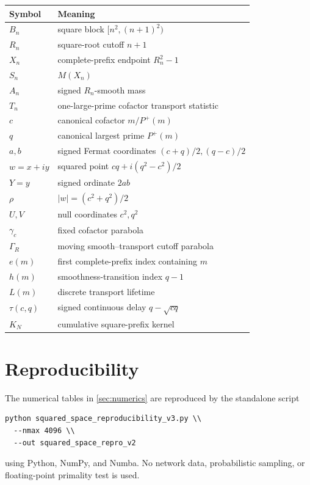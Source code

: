 \documentclass[11pt]{article}
\theoremstyle{definition}
\newcommand{\Pplus}{P^{+}}
\newcommand{\1}{\mathbf{1}}
\begin{document}
\begin{table}[htbp]
\centering
\small
\renewcommand{\arraystretch}{1.25}
\begin{tabular}{ll}
\toprule
Symbol & Meaning\\
\midrule
$B_n$ & square block $[n^2,(n+1)^2)$\\
$R_n$ & square-root cutoff $n+1$\\
$X_n$ & complete-prefix endpoint $R_n^2-1$\\
$S_n$ & $M(X_n)$\\
$A_n$ & signed $R_n$-smooth mass\\
$T_n$ & one-large-prime cofactor transport statistic\\
$c$ & canonical cofactor $m/\Pplus(m)$\\
$q$ & canonical largest prime $\Pplus(m)$\\
$a,b$ & signed Fermat coordinates $(c+q)/2,(q-c)/2$\\
$w=x+iy$ & squared point $cq+i(q^2-c^2)/2$\\
$Y=y$ & signed ordinate $2ab$\\
$\rho$ & $|w|=(c^2+q^2)/2$\\
$U,V$ & null coordinates $c^2,q^2$\\
$\gamma_c$ & fixed cofactor parabola\\
$\Gamma_R$ & moving smooth--transport cutoff parabola\\
$e(m)$ & first complete-prefix index containing $m$\\
$h(m)$ & smoothness-transition index $q-1$\\
$L(m)$ & discrete transport lifetime\\
$\tau(c,q)$ & signed continuous delay $q-\sqrt{cq}$\\
$K_N$ & cumulative square-prefix kernel\\
\bottomrule
\end{tabular}
\end{table}

\section{Reproducibility}
\label{app:reproducibility}

The numerical tables in \cref{sec:numerics} are reproduced by the standalone script
\begin{verbatim}
python squared_space_reproducibility_v3.py \\
  --nmax 4096 \\
  --out squared_space_repro_v2
\end{verbatim}
using Python, NumPy, and Numba.  No network data, probabilistic sampling, or floating-point primality test is used.
\end{document}
